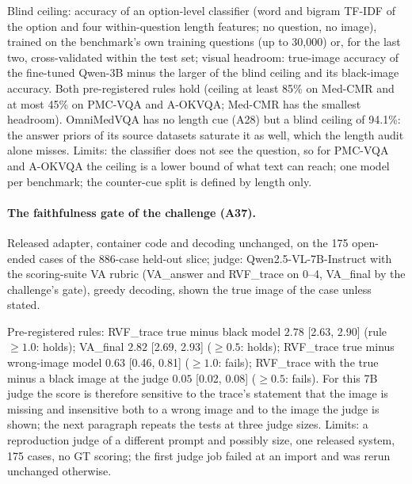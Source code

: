 Blind ceiling: accuracy of an option-level classifier (word and bigram TF-IDF of the option and four within-question length features; no question, no image), trained on the benchmark's own training questions (up to 30{,}000) or, for the last two, cross-validated within the test set; visual headroom: true-image accuracy of the fine-tuned Qwen-3B minus the larger of the blind ceiling and its black-image accuracy.
Both pre-registered rules hold (ceiling at least 85\% on Med-CMR and at most 45\% on PMC-VQA and A-OKVQA; Med-CMR has the smallest headroom).
OmniMedVQA has no length cue (A28) but a blind ceiling of 94.1\%: the answer priors of its source datasets saturate it as well, which the length audit alone misses.
Limits: the classifier does not see the question, so for PMC-VQA and A-OKVQA the ceiling is a lower bound of what text can reach; one model per benchmark; the counter-cue split is defined by length only.

\paragraph{The faithfulness gate of the challenge (A37).}
Released adapter, container code and decoding unchanged, on the 175 open-ended cases of the 886-case held-out slice; judge: Qwen2.5-VL-7B-Instruct with the scoring-suite VA rubric (VA\_answer and RVF\_trace on 0--4, VA\_final by the challenge's gate), greedy decoding, shown the true image of the case unless stated.
\begin{center}
\footnotesize
\setlength{\tabcolsep}{3pt}
\end{center}
Pre-registered rules: RVF\_trace true minus black model $2.78$ [2.63, 2.90] (rule $\ge1.0$: holds); VA\_final $2.82$ [2.69, 2.93] ($\ge0.5$: holds); RVF\_trace true minus wrong-image model $0.63$ [0.46, 0.81] ($\ge1.0$: fails); RVF\_trace with the true minus a black image at the judge $0.05$ [0.02, 0.08] ($\ge0.5$: fails).
For this 7B judge the score is therefore sensitive to the trace's statement that the image is missing and insensitive both to a wrong image and to the image the judge is shown; the next paragraph repeats the tests at three judge sizes.
Limits: a reproduction judge of a different prompt and possibly size, one released system, 175 cases, no GT scoring; the first judge job failed at an import and was rerun unchanged otherwise.

